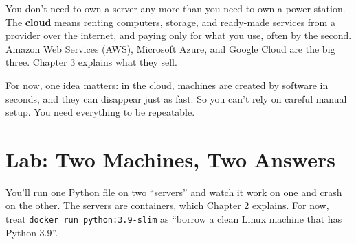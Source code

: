 You don't need to own a server any more than you need to own a power station. The \textbf{cloud} means renting computers, storage, and ready-made services from a provider over the internet, and paying only for what you use, often by the second. Amazon Web Services (AWS), Microsoft Azure, and Google Cloud are the big three. Chapter 3 explains what they sell.

For now, one idea matters: in the cloud, machines are created by software in seconds, and they can disappear just as fast. So you can't rely on careful manual setup. You need everything to be repeatable.

\section{Lab: Two Machines, Two Answers}\label{01-from-works-on-my-machine-to-works-for-everyone:lab-two-machines-two-answers}

You'll run one Python file on two ``servers'' and watch it work on one and crash on the other. The servers are containers, which Chapter 2 explains. For now, treat \texttt{docker\ run\ python:}\allowbreak{}\texttt{3.}\allowbreak{}\texttt{9-}\allowbreak{}\texttt{slim} as ``borrow a clean Linux machine that has Python 3.9''.

